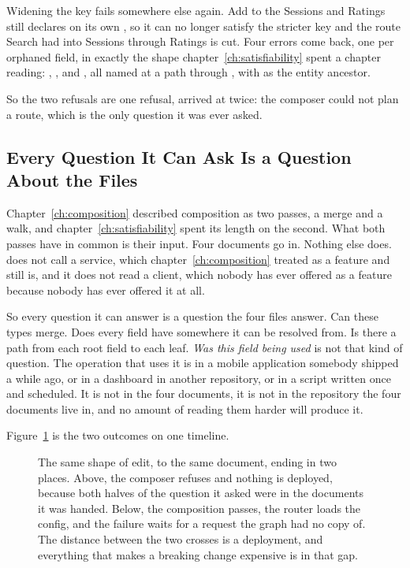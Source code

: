 %
Widening the key fails somewhere else again. Add  to the Sessions
 and Ratings still declares  on its own
, so it can no longer satisfy the stricter key and the route
Search had into Sessions through Ratings is cut. Four errors come back, one
per orphaned field, in exactly the shape
chapter~\ref{ch:satisfiability} spent a chapter reading: ,
,  and , all named at a
path through , with  as the entity ancestor.

%
So the two refusals are one refusal, arrived at twice: the composer could not
plan a route, which is the only question it was ever asked.

\subsection{Every Question It Can Ask Is a Question About the Files}

%
Chapter~\ref{ch:composition} described composition as two passes, a merge and
a walk, and chapter~\ref{ch:satisfiability} spent its length on the second.
What both passes have in common is their input. Four documents go in. Nothing
else does.  does not call a service, which
chapter~\ref{ch:composition} treated as a feature and still is, and it does
not read a client, which nobody has ever offered as a feature because nobody
has ever offered it at all.

%
So every question it can answer is a question the four files answer. Can these
types merge. Does every field have somewhere it can be resolved from. Is there
a path from each root field to each leaf. \emph{Was this field being used} is
not that kind of question. The operation that uses it is in a mobile
application somebody shipped a while ago, or in a dashboard in another
repository, or in a script written once and scheduled. It is not in the four
documents, it is not in the repository the four documents live in, and no
amount of reading them harder will produce it.

%
Figure~\ref{fig:ch16-two-places-a-change-can-fail} is the two outcomes on one
timeline.

\begin{figure}[htbp]
  \centering
  
  \caption{The same shape of edit, to the same document, ending in two places.
  Above, the composer refuses and nothing is deployed, because both halves of
  the question it asked were in the documents it was handed. Below, the
  composition passes, the router loads the config, and the failure waits for a
  request the graph had no copy of. The distance between the two crosses is a
  deployment, and everything that makes a breaking change expensive is in that
  gap.}
  \label{fig:ch16-two-places-a-change-can-fail}
\end{figure}


